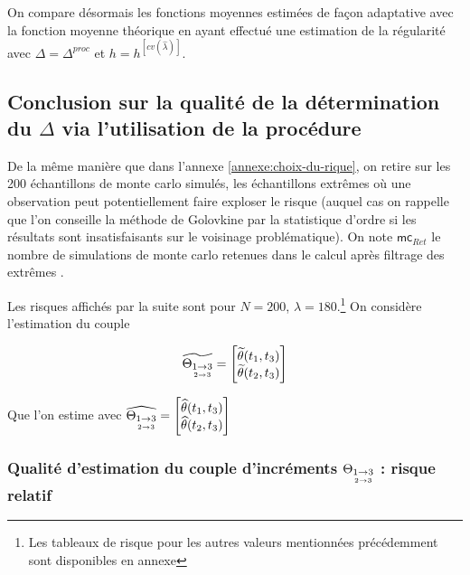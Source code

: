 On compare désormais les fonctions moyennes estimées de façon adaptative avec la fonction moyenne théorique en ayant effectué une estimation de la régularité avec $\Delta = \Delta^{proc}$ et $h = h^{[cv(\widehat \lambda)]}$.


\subsection{Conclusion sur la qualité de la détermination du $\Delta$ via l'utilisation de la procédure}

\noindent De la même manière que dans l'annexe \ref{annexe:choix-du-rique}, on retire sur les 200 échantillons de monte carlo simulés, les échantillons \og extrêmes \fg où une observation peut potentiellement faire exploser le risque (auquel cas on rappelle que l'on conseille la méthode de Golovkine par la statistique d'ordre si les résultats sont insatisfaisants sur le voisinage problématique). On note $\textsf{mc}_{Ret}$ le nombre de simulations de monte carlo retenues dans le calcul après filtrage des \og extrêmes \fg.

\bigskip

\noindent Les risques affichés par la suite sont pour $N=200$, $\lambda = 180$.\footnote{Les tableaux de risque pour les autres valeurs mentionnées précédemment sont disponibles en annexe} On considère l'estimation du couple

\begin{minipage}{0.45\textwidth}
	\begin{equation*}
		\widetilde {\Theta_{\underset{2 \rightarrow 3}{1 \rightarrow 3}}} = \begin{bmatrix} \widetilde \theta(t_1, t_3)\\ \widetilde \theta(t_2, t_3) \end{bmatrix}
	\end{equation*}
\end{minipage}
\begin{minipage}{0.45\textwidth}
	Que l'on estime avec $\widehat {\Theta_{\underset{2 \rightarrow 3}{1 \rightarrow 3}}} = \begin{bmatrix} \widehat \theta(t_1, t_3)\\ \widehat \theta(t_2, t_3) \end{bmatrix}$
\end{minipage}

\bigskip

\subsubsection{Qualité d'estimation du couple d'incréments $\Theta_{\underset{2 \rightarrow 3}{1 \rightarrow 3}}$ : risque relatif}

